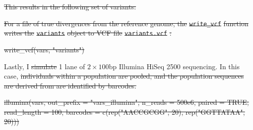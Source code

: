\documentclass[12pt,]{article}
\newenvironment{Shaded}{}{}
\newcommand{\DataTypeTok}[1]{#1}
\newcommand{\DecValTok}[1]{#1}
\newcommand{\FloatTok}[1]{#1}
\newcommand{\KeywordTok}[1]{\textcolor[rgb]{0.00,0.00,1.00}{#1}}
\newcommand{\NormalTok}[1]{#1}
\newcommand{\OtherTok}[1]{\textcolor[rgb]{1.00,0.25,0.00}{#1}}
\newcommand{\StringTok}[1]{\textcolor[rgb]{0.00,0.50,0.50}{#1}}
\providecommand{\DIFaddtex}[1]{{\protect\color{blue}\uwave{#1}}} %
\providecommand{\DIFdeltex}[1]{{\protect\color{red}\sout{#1}}}                      %
\providecommand{\DIFaddbegin}{} %
\providecommand{\DIFaddend}{} %
\providecommand{\DIFdelbegin}{} %
\providecommand{\DIFdelend}{} %
\providecommand{\DIFadd}[1]{\texorpdfstring{\DIFaddtex{#1}}{#1}} %
\providecommand{\DIFdel}[1]{\texorpdfstring{\DIFdeltex{#1}}{}} %
\newcommand{\DIFscaledelfig}{0.5}
\newlength{\DIFdelgraphicswidth} %
\newlength{\DIFdelgraphicsheight} %
\newcommand{\DIFaddincludegraphics}[2][]{{\color{blue}\fbox{\DIFOincludegraphics[#1]{#2}}}} %
\newcommand{\DIFdelincludegraphics}[2][]{%
\sbox{\DIFdelgraphicsbox}{\DIFOincludegraphics[#1]{#2}}%
\settoboxwidth{\DIFdelgraphicswidth}{\DIFdelgraphicsbox} %
\settoboxtotalheight{\DIFdelgraphicsheight}{\DIFdelgraphicsbox} %
\scalebox{\DIFscaledelfig}{%
\parbox[b]{\DIFdelgraphicswidth}{\usebox{\DIFdelgraphicsbox}\\[-\baselineskip] \rule{\DIFdelgraphicswidth}{0em}}\llap{\resizebox{\DIFdelgraphicswidth}{\DIFdelgraphicsheight}{%
\setlength{\unitlength}{\DIFdelgraphicswidth}%
\begin{picture}(1,1)%
\thicklines\linethickness{2pt} %
{\color[rgb]{1,0,0}\put(0,0){\framebox(1,1){}}}%
{\color[rgb]{1,0,0}\put(0,0){\line( 1,1){1}}}%
{\color[rgb]{1,0,0}\put(0,1){\line(1,-1){1}}}%
\end{picture}%
}\hspace*{3pt}}} %
} %
\DeclareRobustCommand{\DIFaddbegin}{\DIFOaddbegin \let\includegraphics\DIFaddincludegraphics} %
\DeclareRobustCommand{\DIFaddend}{\DIFOaddend \let\includegraphics\DIFOincludegraphics} %
\DeclareRobustCommand{\DIFdelbegin}{\DIFOdelbegin \let\includegraphics\DIFdelincludegraphics} %
\DeclareRobustCommand{\DIFdelend}{\DIFOaddend \let\includegraphics\DIFOincludegraphics} %
\begin{document}
\DIFdelbegin \DIFdel{This results in the following set of variants:
}%


\DIFdel{For a file of true divergences from the reference genome, the }\texttt{\DIFdel{write\_vcf}} %
\DIFdel{function
writes the }\texttt{\DIFdel{variants}} %
\DIFdel{object to VCF file }\texttt{\DIFdel{variants.vcf}}%
\DIFdel{:
}%

\DIFdel{\KeywordTok{write_vcf}\NormalTok{(vars, }\StringTok{"variants"}\NormalTok{)}
}%

\DIFdelend Lastly, I \DIFdelbegin \DIFdel{simulate }\DIFdelend \DIFaddbegin \DIFadd{simulated }\DIFaddend 1 lane of \(2 \times 100\)bp Illumina HiSeq 2500 sequencing.
In this case, \DIFdelbegin \DIFdel{individuals within a population are pooled, and the population
sequences are derived from are identified by barcodes.
}%

\DIFdel{\KeywordTok{illumina}\NormalTok{(vars, }\DataTypeTok{out_prefix =} \StringTok{"vars_illumina"}\NormalTok{, }\DataTypeTok{n_reads =} \FloatTok{500e6}\NormalTok{, }\DataTypeTok{paired =} \OtherTok{TRUE}\NormalTok{,}
         \DataTypeTok{read_length =} \DecValTok{100}\NormalTok{, }\DataTypeTok{barcodes =} \KeywordTok{c}\NormalTok{(}\KeywordTok{rep}\NormalTok{(}\StringTok{"AACCGCGG"}\NormalTok{, }\DecValTok{20}\NormalTok{), }
                                         \KeywordTok{rep}\NormalTok{(}\StringTok{"GGTTATAA"}\NormalTok{, }\DecValTok{20}\NormalTok{)))}
}%
\end{document}

